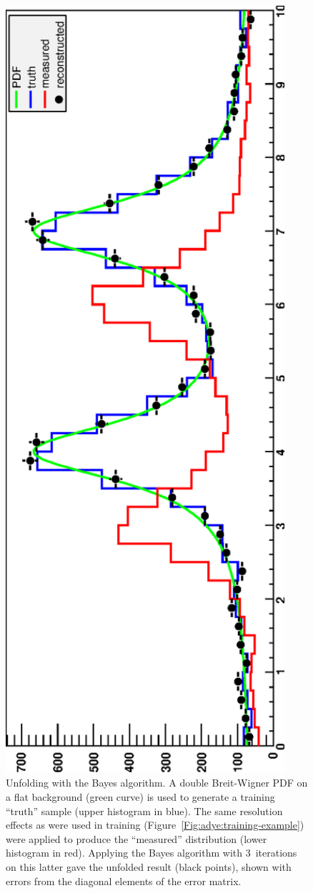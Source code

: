 \documentclass{desyproc}
\begin{document}
\begin{figure}[ht]
\centerline{\includegraphics[angle=-90,width=0.92\textwidth,clip]{adye_tim.bayes2.eps}}
\caption{Unfolding with the Bayes algorithm.
A double Breit-Wigner PDF on a flat background (green curve) is used to generate
a training ``truth'' sample (upper histogram in blue). The same resolution effects
as were used in training (Figure~\ref{Fig:adye:training-example}) were applied
to produce the ``measured'' distribution (lower histogram in red).
Applying the Bayes algorithm with 3~iterations on this latter gave the unfolded result
(black points), shown with errors from the diagonal elements of the error matrix.
}\label{Fig:adye:bayes-example}
\end{figure}%
\end{document}
